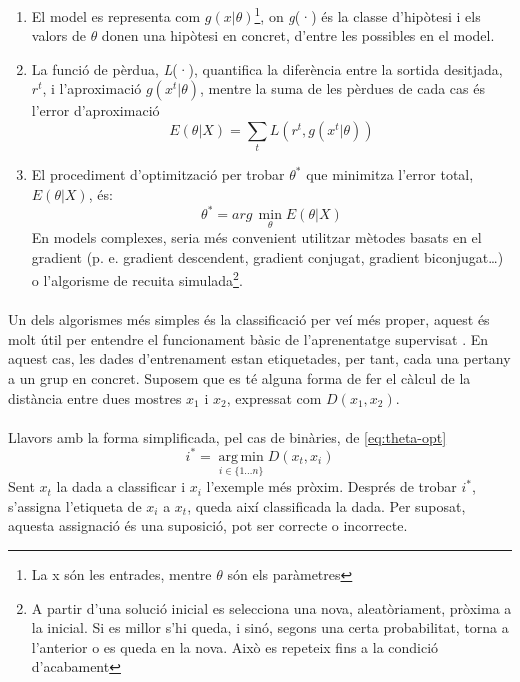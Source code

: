 \documentclass[12pt,a4paper,final,twoside]{article}
\begin{document}
\begin{enumerate}

\item El model es representa com $g(x|\theta)$\footnote{La x són les entrades, mentre $\theta$ són els paràmetres}, on \textit{g}(·) és la classe d'hipòtesi i els valors de $\theta$ donen una hipòtesi en concret, d'entre les possibles en el model.

\item La funció de pèrdua, \textit{L}(·), quantifica la diferència entre la sortida desitjada, $r^t$, i l'aproximació $g(x^t|\theta)$, mentre la suma de les pèrdues de cada cas és l'error d'aproximació \begin{equation} \label{eq:er-aprox}
E(\theta|X)=\sum_{t} L(r^t,g(x^t|\theta))
\end{equation}

\item El procediment d'optimització per trobar $\theta^*$ que minimitza l'error total, $E(\theta|X)$, és:
\begin{equation} \label{eq:theta-opt}
\theta^*=arg\,\operatorname*{min}_\theta E(\theta|X)
\end{equation}
En models complexes, seria més convenient utilitzar mètodes basats en el gradient (p. e. gradient descendent, gradient conjugat, gradient biconjugat\dots) o l'algorisme de recuita simulada\footnote{A partir d'una solució inicial es selecciona una nova, aleatòriament, pròxima a la inicial. Si es millor s'hi queda, i sinó, segons una certa probabilitat, torna a l'anterior o es queda en la nova. Això es repeteix fins a la condició d'acabament\cite{Torrent-Fontbona2013}}.

\end{enumerate}

\paragraph{}Un dels algorismes més simples és la classificació per veí més proper, aquest és molt útil per entendre el funcionament bàsic de l'aprenentatge supervisat \cite{Learned-Miller2014}. En aquest cas, les dades d'entrenament estan etiquetades, per tant, cada una pertany a un grup en concret. Suposem que es té alguna forma de fer el càlcul de la distància entre dues mostres $x_{1}$ i $x_{2}$, expressat com $D(x_{1}, x_{2})$.

\paragraph{}Llavors amb la forma simplificada, pel cas de binàries, de \eqref{eq:theta-opt}
\begin{equation} \label{eq:theta-opt-exemple}
i^*=\operatorname*{arg\,min}_{i\in\{1\dots n\}} D(x_{t}, x_{i})
\end{equation}
Sent $x_{t}$ la dada a classificar i $x_{i}$ l'exemple més pròxim. Després de trobar $i^*$, s'assigna l'etiqueta de $x_{i}$ a $x_{t}$, queda així classificada la dada. Per suposat, aquesta assignació és una suposició, pot ser correcte o incorrecte.
\end{document}
